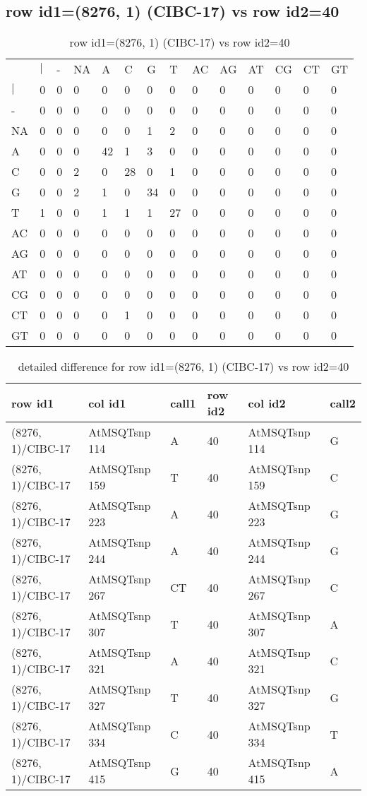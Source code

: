 \subsection{row id1=(8276, 1) (CIBC-17) vs row id2=40}
\begin{center}
\begin{longtable}{|l|l|l|l|l|l|l|l|l|l|l|l|l|l|}
\caption{row id1=(8276, 1) (CIBC-17) vs row id2=40} \label{table_dm234}\\
\hline
\\
\hline
&$|$&-&NA&A&C&G&T&AC&AG&AT&CG&CT&GT\\
$|$&0&0&0&0&0&0&0&0&0&0&0&0&0\\
-&0&0&0&0&0&0&0&0&0&0&0&0&0\\
NA&0&0&0&0&0&1&2&0&0&0&0&0&0\\
A&0&0&0&42&1&3&0&0&0&0&0&0&0\\
C&0&0&2&0&28&0&1&0&0&0&0&0&0\\
G&0&0&2&1&0&34&0&0&0&0&0&0&0\\
T&1&0&0&1&1&1&27&0&0&0&0&0&0\\
AC&0&0&0&0&0&0&0&0&0&0&0&0&0\\
AG&0&0&0&0&0&0&0&0&0&0&0&0&0\\
AT&0&0&0&0&0&0&0&0&0&0&0&0&0\\
CG&0&0&0&0&0&0&0&0&0&0&0&0&0\\
CT&0&0&0&0&1&0&0&0&0&0&0&0&0\\
GT&0&0&0&0&0&0&0&0&0&0&0&0&0\\
\hline
\end{longtable}
\end{center}

\begin{center}
\begin{longtable}{|l|l|l|l|l|l|}
\caption{detailed difference for row id1=(8276, 1) (CIBC-17) vs row id2=40} \label{table_dm235}\\
\hline
row id1&col id1&call1&row id2&col id2&call2\\
\hline
(8276, 1)/CIBC-17&AtMSQTsnp 114&A&40&AtMSQTsnp 114&G\\
(8276, 1)/CIBC-17&AtMSQTsnp 159&T&40&AtMSQTsnp 159&C\\
(8276, 1)/CIBC-17&AtMSQTsnp 223&A&40&AtMSQTsnp 223&G\\
(8276, 1)/CIBC-17&AtMSQTsnp 244&A&40&AtMSQTsnp 244&G\\
(8276, 1)/CIBC-17&AtMSQTsnp 267&CT&40&AtMSQTsnp 267&C\\
(8276, 1)/CIBC-17&AtMSQTsnp 307&T&40&AtMSQTsnp 307&A\\
(8276, 1)/CIBC-17&AtMSQTsnp 321&A&40&AtMSQTsnp 321&C\\
(8276, 1)/CIBC-17&AtMSQTsnp 327&T&40&AtMSQTsnp 327&G\\
(8276, 1)/CIBC-17&AtMSQTsnp 334&C&40&AtMSQTsnp 334&T\\
(8276, 1)/CIBC-17&AtMSQTsnp 415&G&40&AtMSQTsnp 415&A\\
\hline
\end{longtable}
\end{center}

